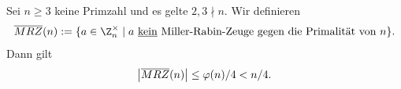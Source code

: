 \begin{theorem}\label{thm:Miller-Rabin}
 Sei $n \geq 3$ keine Primzahl und es gelte $2, 3 \nmid n$. Wir definieren
 \[\ov{MRZ}(n) := \{a \in \Z_n^{\times} \mid a \text{ \underline{kein} Miller-Rabin-Zeuge gegen die Primalität von } n\}.\]
 Dann gilt 
 \[ \left|\overline{MRZ}(n)\right| \leq \varphi(n)/4 < n/4.\] 
\end{theorem}
%  
%  
%  
%  
